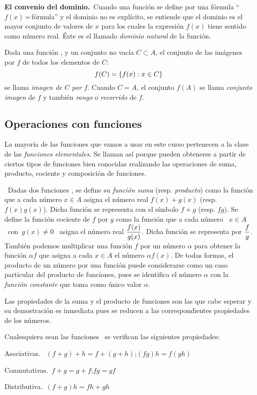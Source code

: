 \documentclass[oneside,spanish,2m,twoside,svgnames,x11names,HTML,12pt]{libro-matua}\usepackage[]{graphicx}\usepackage[]{color}
\begin{document}
\noindent \textbf{El convenio del dominio.}\ Cuando una función se
define por una fórmula ``$f(x)\,$=\,fórmula'' y el dominio no
es explícito, se entiende que el dominio es el mayor conjunto de valores
de $x$ para los cuales la expresión $f(x)$ tiene sentido como número
real. Éste es el llamado \emph{dominio natural} de la función.

Dada una función , y un conjunto no vacía $C\subset A$,
el conjunto de las imágenes por $f$ de todos los elementos de $C$:
\[
f(C)=\left\lbrace f(x):x\in C \right\rbrace
\]
se llama \emph{imagen de $C$ por $f$}. Cuando $C=A$, el conjunto
$f(A)$ se llama \emph{conjunto imagen} de $f$ y también \emph{rango}
o \emph{recorrido} de $f$. 

\subsection{Operaciones con funciones}

La mayoría de las funciones que vamos a usar en este curso pertenecen
a la clase de las \emph{funciones elementales}. Se llaman así porque
pueden obtenerse a partir de ciertos tipos de funciones bien conocidas
realizando las operaciones de suma, producto, cociente y composición
de funciones.

\ Dadas
dos funciones , se define su \emph{función suma}
(resp. \emph{producto}) como la función que a cada número $x\in A$
asigna el número real $f(x)+g(x)$ (resp. $f(x)g(x)$). Dicha función
se representa con el símbolo $f+g$ (resp. $fg$). Se define la función
cociente de $f$ por $g$ como la función que a cada número %
\mbox{%
$x\in A$ con $g(x)\neq0$%
} asigna el número real $\displaystyle\frac{f(x)}{g(x)}$. Dicha función se
representa por $\displaystyle\frac{f}{g}$. También podemos multiplicar una
función $f$ por un número $\alpha$ para obtener la función $\alpha f$
que asigna a cada $x\in A$ el número $\alpha f(x)$. De todas formas,
el producto de un número por una función puede considerarse como un
caso particular del producto de funciones, pues se identifica el número
$\alpha$ con la \emph{función constante} que toma como único valor
$\alpha$.

Las propiedades de la suma y el producto de funciones son las que
cabe esperar y su demostración es inmediata pues se reducen a las
correspondientes propiedades de los números. \begin{proposicion}{}{}
Cualesquiera sean las funciones \ se verifican
las siguientes propiedades:\par Asociativas. \ $(f+g)+h=f+(g+h)$;\quad{}$(fg)h=f(gh)$\par Conmutativas.\ $f+g=g+f$;\quad{}$fg=gf$\par Distributiva.\ $(f+g)h=fh+gh$
\end{proposicion}
\end{document}

